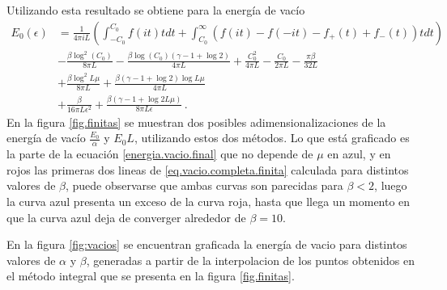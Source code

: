 Utilizando esta resultado se obtiene para la energía de vacío
\begin{align}
\label{eq.vacio.completa.finita}
\nonumber
	E _0 (\epsilon )&=  
		\frac{1}{4 \pi i L} 
		\left(
			\int _{-C _0} ^{C _0} f (i t) t dt
			+ \int _{C _0} ^{\infty}  \left( f(i t) - f(-i t) - f _{+} (t) + f _{-} (t) \right) t dt
			\right) 
\\ \nonumber &
	- \frac{\beta \log ^2 (C _0) }{8 \pi L}
	-\frac{\beta \log (C _0) (\gamma -1 + \log 2  )}{4 \pi L}
	+ \frac{C _0 ^2}{4 \pi L}
	- \frac{C _0}{2 \pi L}
	- \frac{\pi \beta}{32 L}
\\ \nonumber &
	+ \frac{\beta \log ^2 L \mu}{8 \pi L}
	+ \frac{\beta (\gamma -1 + \log 2  )  \log L \mu}{4 \pi L}
\\ &
	+ \frac{\beta}{16 \pi L \epsilon ^2}
	+ \frac{\beta (\gamma -1 + \log 2 L \mu )}{8  \pi L \epsilon }
	\, .
\end{align}
En la figura \ref{fig.finitas} se muestran dos posibles adimensionalizaciones de la energía de vacío $\frac{E _0}{\alpha}$ y $E _0 L$, utilizando estos dos métodos. Lo que está graficado es la parte de la ecuación \eqref{energia.vacio.final} que no depende de $\mu$ en azul, y en rojos las primeras dos lineas de \eqref{eq.vacio.completa.finita} calculada para distintos valores de $\beta$, puede observarse que ambas curvas son parecidas para $\beta < 2$, luego la curva azul presenta un exceso de la curva roja, hasta que llega un momento en que la curva azul deja de converger alrededor de $\beta = 10$.

En la figura \ref{fig:vacios} se encuentran graficada la energía de vacio para distintos valores de $\alpha$ y $\beta$, generadas a partir de la interpolacion de los puntos obtenidos en el método integral que se presenta en la figura \ref{fig.finitas}.





